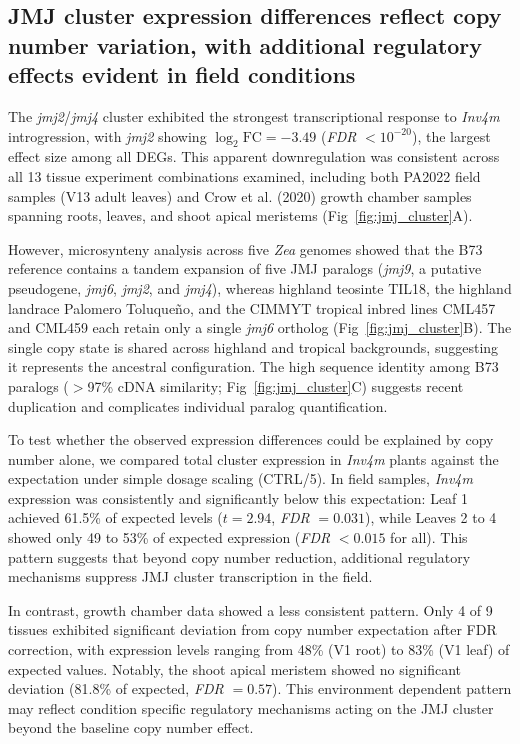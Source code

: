 \documentclass[9pt,twocolumn,twoside]{rilabRxiv}
\newcommand{\invfour}{\textit{Inv4m}\xspace}
\newcommand{\jmjii}{\textit{jmj2}\xspace}
\newcommand{\jmjiv}{\textit{jmj4}\xspace}
\newcommand{\jmjvi}{\textit{jmj6}\xspace}
\newcommand{\jmjix}{\textit{jmj9}\xspace}
\begin{document}
\subsection{JMJ cluster expression differences reflect copy number variation, with additional regulatory effects evident in field conditions}

The \jmjii/\jmjiv cluster exhibited the strongest transcriptional response to \invfour introgression, with \jmjii showing $\log_2 \text{FC} = -3.49$ (\textit{FDR} $< 10^{-20}$), the largest effect size among all DEGs.
This apparent downregulation was consistent across all 13 tissue experiment combinations examined, including both PA2022 field samples (V13 adult leaves) and Crow et al. (2020) growth chamber samples spanning roots, leaves, and shoot apical meristems (Fig~\ref{fig:jmj_cluster}A).

However, microsynteny analysis across five \textit{Zea} genomes showed that the B73 reference contains a tandem expansion of five JMJ paralogs (\jmjix, a putative pseudogene, \jmjvi, \jmjii, and \jmjiv), whereas highland teosinte TIL18, the highland landrace Palomero Toluque\~{n}o, and the CIMMYT tropical inbred lines CML457 and CML459 each retain only a single \textit{jmj6} ortholog (Fig~\ref{fig:jmj_cluster}B).
The single copy state is shared across highland and tropical backgrounds, suggesting it represents the ancestral configuration.
The high sequence identity among B73 paralogs ($>$97\% cDNA similarity; Fig~\ref{fig:jmj_cluster}C) suggests recent duplication and complicates individual paralog quantification.

To test whether the observed expression differences could be explained by copy number alone, we compared total cluster expression in \invfour plants against the expectation under simple dosage scaling (CTRL/5).
In field samples, \invfour expression was consistently and significantly below this expectation: Leaf 1 achieved 61.5\% of expected levels ($t = 2.94$, \textit{FDR} $= 0.031$), while Leaves 2 to 4 showed only 49 to 53\% of expected expression (\textit{FDR} $< 0.015$ for all).
This pattern suggests that beyond copy number reduction, additional regulatory mechanisms suppress JMJ cluster transcription in the field.

In contrast, growth chamber data showed a less consistent pattern.
Only 4 of 9 tissues exhibited significant deviation from copy number expectation after FDR correction, with expression levels ranging from 48\% (V1 root) to 83\% (V1 leaf) of expected values.
Notably, the shoot apical meristem showed no significant deviation (81.8\% of expected, \textit{FDR} $= 0.57$).
This environment dependent pattern may reflect condition specific regulatory mechanisms acting on the JMJ cluster beyond the baseline copy number effect.
\end{document}
